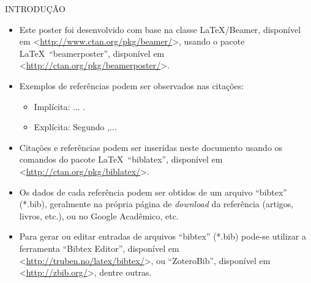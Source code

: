 \documentclass[final]{beamer}
\begin{document}
\begin{frame}[t, fragile = singleslide]{}
\begin{columns}[t]
\begin{column}{0.02\textwidth}
\end{column}

\end{columns}

\begin{columns}[t]

\begin{column}{0.45\textwidth}

\begin{block}{INTRODUÇÃO}
\begin{itemize}
\item Este poster foi desenvolvido com base na classe \LaTeX/Beamer, disponível em <\url{http://www.ctan.org/pkg/beamer/}>, usando o pacote \LaTeX\ ``beamerposter'', disponível em <\url{http://ctan.org/pkg/beamerposter/}>.
\item Exemplos de referências podem ser observados nas citações:
\begin{itemize}
\item Implícita: ... \cite{Lamport1994,VanEkenstein1997}.
\item Explícita: Segundo \textcite{Wizentier1992},...
\end{itemize}
\item Citações e referências podem ser inseridas neste documento usando os comandos do pacote \LaTeX\ ``biblatex'', disponível em <\url{http://ctan.org/pkg/biblatex/}>.
\item Os dados de cada referência podem ser obtidos de um arquivo ``bibtex'' (*.bib), geralmente na própria página de \textit{download} da referência (artigos, livros, etc.), ou no Google Acadêmico, etc.
\item Para gerar ou editar entradas de arquivos ``bibtex'' (*.bib) pode-se utilizar a ferramenta ``Bibtex Editor'', disponível em <\url{http://truben.no/latex/bibtex/}>, ou ``ZoteroBib'', disponível em <\url{http://zbib.org/}>, dentre outras.
\end{itemize}
\end{block}


\end{column}
\end{columns}
\end{frame}
\end{document}
